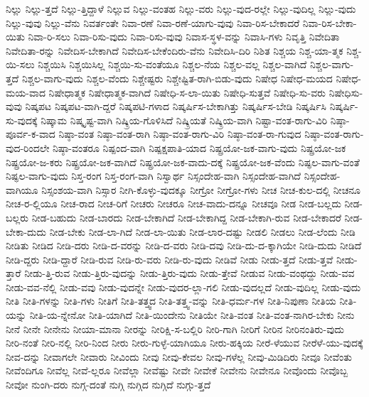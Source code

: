 {ನಿಲ್ಲು
ನಿಲ್ಲು-ತ್ತದೆ
ನಿಲ್ಲು-ತ್ತಿದ್ದಾಳೆ
ನಿಲ್ಲುವ
ನಿಲ್ಲು-ವಂತಹ
ನಿಲ್ಲು-ವರು
ನಿಲ್ಲು-ವುದ-ರಲ್ಲೇ
ನಿಲ್ಲು-ವುದಿಲ್ಲ
ನಿಲ್ಲು-ವುದು
ನಿಲ್ಲು-ವುವು
ನಿಲ್ಲು-ವೆನು
ನಿವರ್ತಂತೇ
ನಿವಾ-ರಣೆ
ನಿವಾ-ರಣೆ-ಯಾಗು-ವುವು
ನಿವಾ-ರಿಸ-ಬೇಕಾದರೆ
ನಿವಾ-ರಿಸ-ಬೇಕಾ-ಯಿತು
ನಿವಾ-ರಿ-ಸಲು
ನಿವಾ-ರಿಸು-ವುದು
ನಿವಾ-ರಿಸು-ವುವು
ನಿವಾಸ-ಸ್ಥಳ-ವನ್ನು
ನಿವಾಸಿ-ಗಳು
ನಿವೃತ್ತಿ
ನಿವೇದಿತಾ
ನಿವೇದಿತಾ-ರನ್ನು
ನಿವೇದಿಸ-ಬೇಕಾಗಿದೆ
ನಿವೇದಿಸ-ಬೇಕೆಂದಿರು-ವೆನು
ನಿವೇದಿಸಿ-ದಿರಿ
ನಿಶಿತ
ನಿಶ್ಚಯ
ನಿಶ್ಚ-ಯಾ-ತ್ಮಕ
ನಿಶ್ಚ-ಯಿ-ಸಲು
ನಿಶ್ಚಯಿಸಿ
ನಿಶ್ಚಯಿಸಿಲ್ಲ
ನಿಶ್ಚಯಿ-ಸು-ವಂತೆಯೂ
ನಿಶ್ಚಲ-ನೆಯ
ನಿಶ್ಚಲ-ವಲ್ಲ
ನಿಶ್ಚಲ-ವಾಗಿದೆ
ನಿಶ್ಚಲ-ವಾಗು-ತ್ತದೆ
ನಿಶ್ಚಲ-ವಾಗು-ವುದು
ನಿಶ್ಚಲ-ವೆಂದು
ನಿಶ್ಚೇಷ್ಟರು
ನಿಶ್ಚೇಷ್ಟಿತ-ರಾಗಿ-ಬಿಡು-ವುದು
ನಿಷೇಧ
ನಿಷೇಧ-ಮಯದ
ನಿಷೇಧ-ಮಯ-ವಾದ
ನಿಷೇಧಾತ್ಮಕ
ನಿಷೇಧಾತ್ಮಕ-ವಾಗಿದೆ
ನಿಷೇಧಿ-ಸ-ಲಾ-ಯಿತು
ನಿಷೇಧಿ-ಸುತ್ತವೆ
ನಿಷೇಧಿ-ಸು-ವರು
ನಿಷೇಧಿಸು-ವುವು
ನಿಷ್ಕಪಟ
ನಿಷ್ಕಪಟ-ವಾಗಿ-ದ್ದರೆ
ನಿಷ್ಕಪಟಿ-ಗಳಾದ
ನಿಷ್ಕರ್ಷಿಸ-ಬೇಕಾಗಿತ್ತು
ನಿಷ್ಕರ್ಷಿಸ-ಬೇಡಿ
ನಿಷ್ಕರ್ಷಿಸಿ
ನಿಷ್ಕರ್ಷಿ-ಸು-ವುದಕ್ಕೆ
ನಿಷ್ಕಾಮ
ನಿಷ್ಕೃಷ್ಟ-ವಾಗಿ
ನಿಷ್ಕ್ರಿಯ-ಗೊಳಿಸಿದೆ
ನಿಷ್ಕ್ರಿಯತೆ
ನಿಷ್ಕ್ರಿಯ-ವಾಗಿ
ನಿಷ್ಟಾ-ವಂತ-ರಾಗು-ವಿರಿ
ನಿಷ್ಠಾ-ಪೂರ್ವ-ಕ-ವಾದ
ನಿಷ್ಠಾ-ವಂತ
ನಿಷ್ಠಾ-ವಂತ-ರಾಗಿ
ನಿಷ್ಠಾ-ವಂತ-ರಾಗು-ವಿರಿ
ನಿಷ್ಠಾ-ವಂತ-ರಾ-ಗುವುದ
ನಿಷ್ಠಾ-ವಂತ-ರಾಗು-ವುದ-ರಿಂದಲೇ
ನಿಷ್ಠಾ-ವಂತರೂ
ನಿಷ್ಪಂದ-ವಾಗಿ
ನಿಷ್ಪಕ್ಷಪಾತಿ-ಯಾದ
ನಿಷ್ಪ್ರಯೋ-ಜಕ-ವಾಗು-ವುದು
ನಿಷ್ಪ್ರಯೋ-ಜಕ
ನಿಷ್ಪ್ರಯೋ-ಜ-ಕರು
ನಿಷ್ಪ್ರಯೋ-ಜಕ-ವಾಗಿದೆ
ನಿಷ್ಪ್ರಯೋ-ಜಕ-ವಾದು-ದಕ್ಕೆ
ನಿಷ್ಪ್ರಯೋ-ಜಕ-ವೆಂದು
ನಿಷ್ಫಲ-ವಾಗು-ವಂತೆ
ನಿಷ್ಫಲ-ವಾಗು-ವುದು
ನಿಸ್ತ-ರಂಗ
ನಿಸ್ತ-ರಂಗ-ವಾಗಿ
ನಿಸ್ವಾರ್ಥ
ನಿಸ್ಸಂದೇಹ-ವಾಗಿ
ನಿಸ್ಸಂದೇಹ-ವಾಗಿದೆ
ನಿಸ್ಸಂದೇಹ-ವಾಗಿಯೂ
ನಿಸ್ಸಂಶಯ-ವಾಗಿ
ನಿಸ್ಸಾರ
ನೀಗಿ-ಕೊಳ್ಳು-ವುದಕ್ಕೂ
ನೀಗ್ರೋ
ನೀಗ್ರೋ-ಗಳು
ನೀಚ
ನೀಚ-ಕುಲ-ದಲ್ಲಿ
ನೀಚನೂ
ನೀಚ-ರ-ಲ್ಲಿಯೂ
ನೀಚ-ರಾದ
ನೀಚ-ರಿಗೆ
ನೀಚರು
ನೀಚರೂ
ನೀಚ-ವಾದು-ದನ್ನೂ
ನೀಚವೂ
ನೀಡ
ನೀಡ-ಬಲ್ಲದು
ನೀಡ-ಬಲ್ಲರು
ನೀಡ-ಬಹುದು
ನೀಡ-ಬಾರದು
ನೀಡ-ಬೇಕಾಗಿದೆ
ನೀಡ-ಬೇಕಾಗಿದ್ದ
ನೀಡ-ಬೇಕಾಗಿ-ರುವ
ನೀಡ-ಬೇಕಾದರೆ
ನೀಡ-ಬೇಕಾ-ದುದು
ನೀಡ-ಬೇಕು
ನೀಡ-ಲಾ-ಗಿದೆ
ನೀಡ-ಲಾ-ಯಿತು
ನೀಡ-ಲಾರ-ದಷ್ಟು
ನೀಡಲಿ
ನೀಡಲು
ನೀಡ-ಲೆಂದು
ನೀಡಿ
ನೀಡಿತು
ನೀಡಿದ
ನೀಡಿ-ದರು
ನೀಡಿ-ದ-ವರನ್ನು
ನೀಡಿ-ದ-ವರು
ನೀಡಿ-ದವು
ನೀಡಿ-ದು-ದ-ಕ್ಕಾಗಿಯೇ
ನೀಡಿ-ದುದು
ನೀಡಿದೆ
ನೀಡಿ-ದ್ದರು
ನೀಡಿ-ದ್ದಾರೆ
ನೀಡಿ-ರುವ
ನೀಡಿ-ರು-ವರು
ನೀಡಿ-ರು-ವುದು
ನೀಡಿವೆ
ನೀಡು
ನೀಡು-ತ್ತದೆ
ನೀಡು-ತ್ತವೆ
ನೀಡು-ತ್ತಾರೆ
ನೀಡು-ತ್ತಿ-ರುವ
ನೀಡು-ತ್ತಿರು-ವುದನ್ನು
ನೀಡು-ತ್ತಿರು-ವುದು
ನೀಡು-ತ್ತೇವೆ
ನೀಡುವ
ನೀಡು-ವಂಥದ್ದು
ನೀಡು-ವವ
ನೀಡು-ವವ-ನೆಲ್ಲಿ
ನೀಡು-ವವು
ನೀಡು-ವುದನ್ನೇ
ನೀಡು-ವುದರ-ಲ್ಲಾ-ಗಲಿ
ನೀಡು-ವುದಲ್ಲದೆ
ನೀಡು-ವುದಿಲ್ಲ
ನೀಡು-ವುದು
ನೀತಿ
ನೀತಿ-ಗಳನ್ನು
ನೀತಿ-ಗಳು
ನೀತಿಗೆ
ನೀತಿ-ತತ್ತ್ವದ
ನೀತಿ-ತತ್ತ್ವ-ವನ್ನು
ನೀತಿ-ಧರ್ಮ-ಗಳ
ನೀತಿ-ನಿಪುಣಾ
ನೀತಿಯ
ನೀತಿ-ಯನ್ನು
ನೀತಿ-ಯ-ನ್ನೇನೋ
ನೀತಿ-ಯಾಗಿದೆ
ನೀತಿ-ಯಿಂದೇನು
ನೀತಿಯೇ
ನೀತಿ-ವಂತ
ನೀತಿ-ವಂತ-ನಾಗಿರ-ಬೇಕು
ನೀನು
ನೀನೆ
ನೀನೇ
ನೀನೇನು
ನೀಯಾ-ಮಾನಾ
ನೀರನ್ನು
ನೀರಿಕ್ಷಿ-ಸ-ಬಲ್ಲಿರಿ
ನೀರಿ-ಗಾಗಿ
ನೀರಿಗೆ
ನೀರಿನ
ನೀರಿನಂತಿರು-ವುದು
ನೀರಿ-ನಂತೆ
ನೀರಿ-ನಲ್ಲಿ
ನೀರಿ-ನಿಂದ
ನೀರು
ನೀರು-ಗುಳ್ಳೆ-ಯಾಗಿಯೂ
ನೀರು-ಹಕ್ಕಿಯ
ನೀರೆ-ಳೆಯುವ
ನೀರೆಳೆ-ಯು-ವುದಕ್ಕೆ
ನೀವ-ದನ್ನು
ನೀವಾಗಲೇ
ನೀವಾರು
ನೀವಿಂದು
ನೀವು
ನೀವು-ಕೇವಲ
ನೀವು-ಗಳೆಲ್ಲ
ನೀವು-ಮಿಡಿದಿರು
ನೀವೂ
ನೀವೆಂತು
ನೀವೆಂದಿಗೂ
ನೀವೆಲ್ಲ
ನೀವೆ-ಲ್ಲರೂ
ನೀವೆಲ್ಲಾ
ನೀವೆಷ್ಟು
ನೀವೇ
ನೀವೇಕೆ
ನೀವೇನು
ನೀವೇನೂ
ನೀವೊಂದು
ನೀವೊಬ್ಬ
ನೀವೋ
ನುಂಗಿ-ದರು
ನುಗ್ಗ-ದಂತೆ
ನುಗ್ಗಿ
ನುಗ್ಗಿದ
ನುಗ್ಗಿದೆ
ನುಗ್ಗು-ತ್ತದೆ
}
